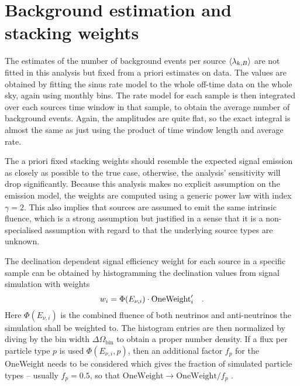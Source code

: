 \section{Background estimation and stacking weights}
The estimates of the number of background events per source $\Braket{\lambda_{k,B}}$ are not fitted in this analysis but fixed from a priori estimates on data.
The values are obtained by fitting the sinus rate model to the whole off-time data on the whole sky, again using monthly bins.
The rate model for each sample is then integrated over each sources time window in that sample, to obtain the average number of background events.
Again, the amplitudes are quite flat, so the exact integral is almost the same as just using the product of time window length and average rate.

The a priori fixed stacking weights should resemble the expected signal emission as closely as possible to the true case, otherwise, the analysis' sensitivity will drop significantly.
Because this analysis makes no explicit assumption on the emission model, the weights are computed using a generic power law with index $\gamma = 2$.
This also implies that sources are assumed to emit the same intrinsic fluence, which is a strong assumption but justified in a sense that it is a non-specialised assumption with regard to that the underlying source types are unknown.

The declination dependent signal efficiency weight for each source in a specific sample can be obtained by histogramming the declination values from signal simulation with weights
\begin{equation}
  w_i = \Phi(E_{\nu,i})\cdot\text{OneWeight}'_i
  \quad\text{.}
\end{equation}
Here $\Phi(E_{\nu,i})$ is the combined fluence of both neutrinos and anti-neutrinos the simulation shall be weighted to.
The histogram entries are then normalized by diving by the bin width $\Delta\Omega_\text{bin}$ to obtain a proper number density.
If a flux per particle type $p$ is used $\Phi(E_{\nu,i}, p)$, then an additional factor $f_p$ for the OneWeight needs to be considered which gives the fraction of simulated particle types – usually $f_p=0.5$, so that $\text{OneWeight}\rightarrow\text{OneWeight}/f_p$ \cite{Gazizov:2004va}.

